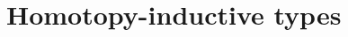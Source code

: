 \documentclass[hott-all.tex]{subfiles}
\begin{document}
\section{Homotopy-inductive types}
% 
% 
% 
\end{document}
